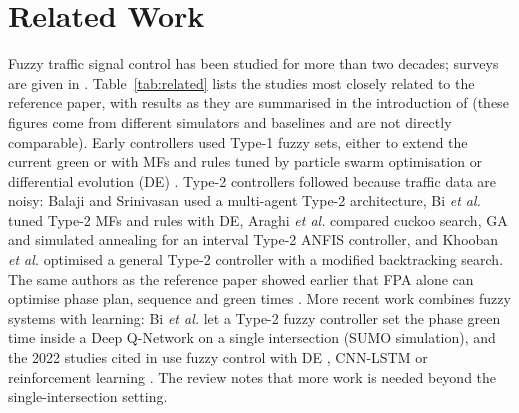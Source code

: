 \section{Related Work}
Fuzzy traffic signal control has been studied for more than two decades; surveys are given in \cite{koukol2015,agrahari2024}.
Table~\ref{tab:related} lists the studies most closely related to the reference paper, with results as they are summarised in the
introduction of \cite{ref_paper} (these figures come from different simulators and baselines and are not directly comparable).
Early controllers used Type-1 fuzzy sets, either to extend the current green \cite{trabia1999} or with MFs and rules tuned by
particle swarm optimisation \cite{chen2006} or differential evolution (DE) \cite{dogan2016}. Type-2 controllers followed because traffic
data are noisy: Balaji and Srinivasan \cite{balaji2009} used a multi-agent Type-2 architecture, Bi \emph{et al.} \cite{bi2014} tuned
Type-2 MFs and rules with DE, Araghi \emph{et al.} \cite{araghi2017} compared cuckoo search, GA and simulated annealing for an
interval Type-2 ANFIS controller, and Khooban \emph{et al.} \cite{khooban2017} optimised a general Type-2 controller with a modified
backtracking search. The same authors as the reference paper showed earlier that FPA alone can optimise phase plan, sequence and green
times \cite{korkmaz2021a}. More recent work combines fuzzy systems with learning: Bi \emph{et al.} \cite{bi2024} let a Type-2 fuzzy
controller set the phase green time inside a Deep Q-Network on a single intersection (SUMO simulation), and the 2022 studies cited in \cite{ref_paper}
use fuzzy control with DE \cite{lin2022}, CNN-LSTM \cite{islam2022} or reinforcement learning \cite{zhao2022}. The review \cite{agrahari2024}
notes that more work is needed beyond the single-intersection setting.

